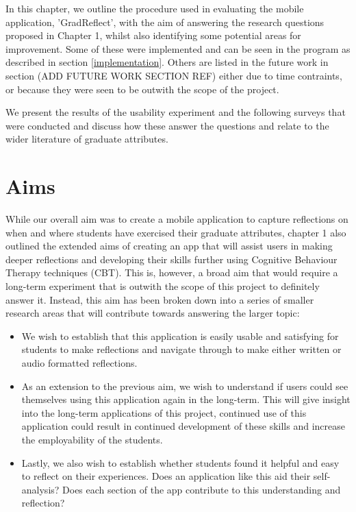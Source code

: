 \documentclass{l4proj}
\begin{document}
In this chapter, we outline the procedure used in evaluating the mobile application, 'GradReflect', 
with the aim of answering the research questions proposed in Chapter 1, whilst also identifying some 
potential areas for improvement. Some of these were implemented and can be seen in the program
as described in section \ref{implementation}. Others are listed in the future work in section (ADD FUTURE WORK SECTION REF)
either due to time contraints, or because they were seen to be outwith the scope of the project.
\par 
We present the results of the 
usability experiment and the following surveys that were conducted and discuss how these 
answer the questions and relate to the wider literature of graduate attributes. 

\section{Aims} \label{evalAims}

While our overall aim was to create a mobile application to capture reflections on when and where
students have exercised their graduate attributes, chapter 1 also outlined the extended aims of creating
an app that will assist users in making deeper reflections and developing their skills further using 
Cognitive Behaviour Therapy techniques (CBT). This is, however, a broad aim that would require a long-term 
experiment that is outwith the scope of this project to definitely answer it. Instead, this aim has been 
broken down into a series of smaller research areas that will contribute towards answering the larger topic:

\begin{itemize}
    \item We wish to establish that this application is easily usable and satisfying 
    for students to make reflections and navigate through to make either written or 
    audio formatted reflections. 
    \item As an extension to the previous aim, we wish to understand if users could see themselves using this 
    application again in the long-term. This will give insight into the long-term applications of this project, 
    continued use of this application could result in continued development of these skills and increase the employability
    of the students.
    \item Lastly, we also wish to establish whether students found it helpful and easy to reflect on their
    experiences. Does an application like this aid their self-analysis? Does each section of the app 
    contribute to this understanding and reflection?
\end{itemize}
\end{document}
